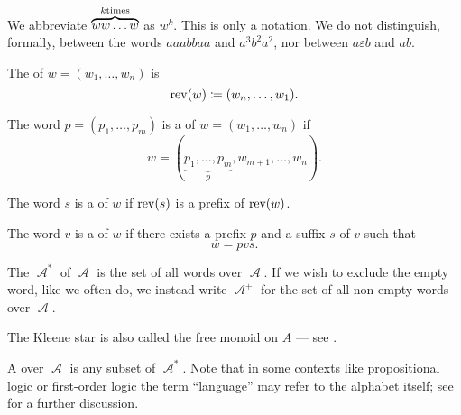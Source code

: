 \begin{definition}
\begin{thmenum}
    We abbreviate \( \overbrace{w w \ldots w}^{k \T{times}} \) as \( w^k \). This is only a notation. We do not distinguish, formally, between the words \( aaabbaa \) and \( a^3 b^2 a^2 \), nor between \( a \varepsilon b \) and \( ab \).

     The  of \( w = (w_1, \ldots, w_n) \) is
    \begin{equation*}
      \operatorname{rev}(w) \coloneqq (w_n, \ldots, w_1).
    \end{equation*}

     The word \( p = (p_1, \ldots, p_m) \) is a  of \( w = (w_1, \ldots, w_n) \) if
    \begin{equation*}
      w = (\underbrace{p_1, \ldots, p_m}_p, w_{m+1}, \ldots, w_n).
    \end{equation*}

     The word \( s \) is a  of \( w \) if \( \operatorname{rev}(s) \) is a prefix of \( \operatorname{rev}(w) \).

     The word \( v \) is a  of \( w \) if there exists a prefix \( p \) and a suffix \( s \) of \( v \) such that
    \begin{equation*}
      w = pvs.
    \end{equation*}

     The  \( \mscrA^* \) of \( \mscrA \) is the set of all words over \( \mscrA \). If we wish to exclude the empty word, like we often do, we instead write \( \mscrA^+ \) for the set of all non-empty words over \( \mscrA \).

    The Kleene star is also called the free monoid on \( A \) --- see .

     A  over \( \mscrA \) is any subset of \( \mscrA^* \). Note that in some contexts like \hyperref[subsec:propositional_logic]{propositional logic} or \hyperref[subsec:first_order_logic]{first-order logic} the term \enquote{language} may refer to the alphabet itself; see  for a further discussion.
  \end{thmenum}
\end{definition}

